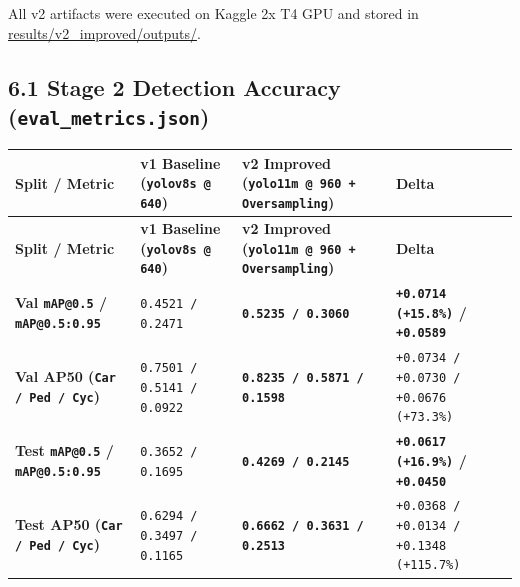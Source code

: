 \documentclass[10.5pt,a4paper]{article}
\begin{document}
All v2 artifacts were executed on Kaggle 2x T4 GPU and stored in \href{https://github.com/Heisnotanimposter/Totalcare\_autonomous\_driving\_Yolov5/tree/main/results/v2\_improved/outputs}{results/v2\_improved/outputs/}.


\subsection{6.1 Stage 2 Detection Accuracy (\texttt{eval\_\allowbreak{}metrics.\allowbreak{}json})}

\begin{footnotesize}
\setlength{\tabcolsep}{4pt}
\setlength{\LTleft}{0pt}\setlength{\LTright}{0pt}
\begin{longtable}{>{\raggedright\arraybackslash}p{} >{\raggedright\arraybackslash}p{} >{\raggedright\arraybackslash}p{} >{\raggedright\arraybackslash}p{}}
\toprule
\textbf{Split / Metric} & \textbf{v1 Baseline (\texttt{yolov8s @ 640})} & \textbf{v2 Improved (\texttt{yolo11m @ 960 + Oversampling})} & \textbf{Delta} \\
\midrule
\endfirsthead
\toprule
\textbf{Split / Metric} & \textbf{v1 Baseline (\texttt{yolov8s @ 640})} & \textbf{v2 Improved (\texttt{yolo11m @ 960 + Oversampling})} & \textbf{Delta} \\
\midrule
\endhead
\bottomrule
\endfoot
\textbf{Val \texttt{mAP@0.\allowbreak{}5} / \texttt{mAP@0.\allowbreak{}5:\allowbreak{}0.\allowbreak{}95}} & \texttt{0.\allowbreak{}4521 /\allowbreak{} 0.\allowbreak{}2471} & \textbf{\texttt{0.\allowbreak{}5235 /\allowbreak{} 0.\allowbreak{}3060}} & \textbf{\texttt{+0.\allowbreak{}0714 (+15.\allowbreak{}8\%)} / \texttt{+0.\allowbreak{}0589}} \\
\textbf{Val AP50 (\texttt{Car /\allowbreak{} Ped /\allowbreak{} Cyc})} & \texttt{0.\allowbreak{}7501 /\allowbreak{} 0.\allowbreak{}5141 /\allowbreak{} 0.\allowbreak{}0922} & \textbf{\texttt{0.\allowbreak{}8235 /\allowbreak{} 0.\allowbreak{}5871 /\allowbreak{} 0.\allowbreak{}1598}} & \texttt{+0.\allowbreak{}0734 /\allowbreak{} +0.\allowbreak{}0730 /\allowbreak{} +0.\allowbreak{}0676 (+73.\allowbreak{}3\%)} \\
\textbf{Test \texttt{mAP@0.\allowbreak{}5} / \texttt{mAP@0.\allowbreak{}5:\allowbreak{}0.\allowbreak{}95}} & \texttt{0.\allowbreak{}3652 /\allowbreak{} 0.\allowbreak{}1695} & \textbf{\texttt{0.\allowbreak{}4269 /\allowbreak{} 0.\allowbreak{}2145}} & \textbf{\texttt{+0.\allowbreak{}0617 (+16.\allowbreak{}9\%)} / \texttt{+0.\allowbreak{}0450}} \\
\textbf{Test AP50 (\texttt{Car /\allowbreak{} Ped /\allowbreak{} Cyc})} & \texttt{0.\allowbreak{}6294 /\allowbreak{} 0.\allowbreak{}3497 /\allowbreak{} 0.\allowbreak{}1165} & \textbf{\texttt{0.\allowbreak{}6662 /\allowbreak{} 0.\allowbreak{}3631 /\allowbreak{} 0.\allowbreak{}2513}} & \texttt{+0.\allowbreak{}0368 /\allowbreak{} +0.\allowbreak{}0134 /\allowbreak{} +0.\allowbreak{}1348 (+115.\allowbreak{}7\%)} \\
\end{longtable}
\end{footnotesize}
\end{document}
